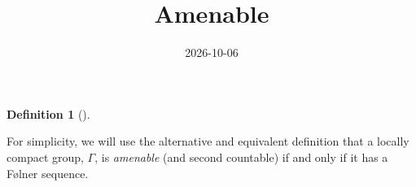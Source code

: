 \documentclass[
  british,
]{article}
\title{Amenable}
\author{}
\date{2026-10-06}
\theoremstyle{definition}
\newtheorem{definition}{Definition}[section]
\theoremstyle{remark}
\newcommand{\AmenableGroup}{{\Gamma}}
\begin{document}
\maketitle


\begin{definition}[]\protect\hypertarget{def-amenable}{}\label{def-amenable}

For simplicity, we will use the alternative and equivalent definition
that a locally compact group, \(\AmenableGroup\), is \emph{amenable}
(and second countable) if and only if it has a Følner sequence.

\end{definition}
\end{document}
